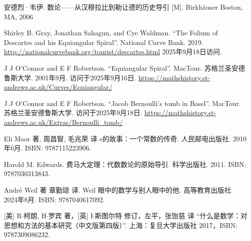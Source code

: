 安德烈·韦伊. 数论——从汉穆拉比到勒让德的历史导引 [M]. Birkhäuser Boston, MA, 2006 %

Shirley B. Gray, Jonathan Sahagun, and Cye Waldman. ``The Folium of Descartes and his Equiangular Spiral''. National Curve Bank. 2019. \url{http://nationalcurvebank.org/tourist/descartes.html} 2025年9月18日访问.

J J O'Connor and E F Robertson. ``Equiangular Spiral''. MacTour. 苏格兰圣安德鲁斯大学. 2001年9月. 访问于2025年9月16日. \url{https://mathshistory.st-andrews.ac.uk/Curves/Equiangular/}

J J O'Connor and E F Robertson. ``Jacob Bernoulli's tomb in Basel''. MacTour. 苏格兰圣安德鲁斯大学. 访问于2025年9月18日. \url{https://mathshistory.st-andrews.ac.uk/Extras/Bernoulli_tomb/}

Eli Maor 著, 周昌智, 毛兆荣 译 e的故事：一个常数的传奇. 人民邮电出版社. 2010年6月. ISBN: 9787115223906.

Harold M. Edwards. 费马大定理：代数数论的原始导引. 科学出版社. 2011. ISBN: 9787030313843.

André Weil 著 章勤琼 译. Weil 眼中的数学与别人眼中的他. 高等教育出版社. 2024年8月. ISBN: 9787040617092.

[美] R$\cdot$柯朗, H$\cdot$罗宾 著，[英] I$\cdot$斯图尔特 修订，左平，张饴慈 译 ``什么是数学：对思想和方法的基本研究（中文版第四版）''. 上海：复旦大学出版社 2017，ISBN: 9787309086232.

